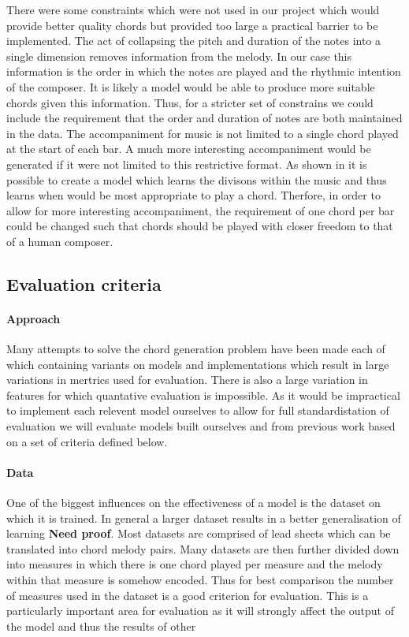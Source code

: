 There were some constraints which were not used in our project which would provide better quality chords but provided too large a practical barrier to be implemented.
The act of collapsing the pitch and duration of the notes into a single dimension removes information from the melody.
In our case this information is the order in which the notes are played and the rhythmic intention of the composer.
It is likely a model would be able to produce more suitable chords given this information.
Thus, for a stricter set of constrains we could include the requirement that the order and duration of notes are both maintained in the data.
The accompaniment for music is not limited to a single chord played at the start of each bar.
A much more interesting accompaniment would be generated if it were not limited to this restrictive format.
As shown in \cite{ReinforcementLearning} it is possible to create a model which learns the divisons within the music and thus learns when would be most appropriate to play a chord.
Therfore, in order to allow for more interesting accompaniment, the requirement of one chord per bar could be changed such that chords should be played with closer freedom to that of a human composer.

\subsection{Evaluation criteria}
\paragraph{Approach}
Many attempts to solve the chord generation problem have been made each of which containing variants on models and implementations which result in large variations in mertrics used for evaluation.
There is also a large variation in features for which quantative evaluation is impossible. 
As it would be impractical to implement each relevent model ourselves to allow for full standardistation of evaluation we will evaluate models built ourselves and from previous work based on a set of criteria defined below.
\paragraph{Data}
One of the biggest influences on the effectiveness of a model is the dataset on which it is trained. 
In general a larger dataset results in a better generalisation of learning \textbf{Need proof}.
Most datasets are comprised of lead sheets which can be translated into chord melody pairs.
Many datasets are then further divided down into measures in which there is one chord played per measure and the melody within that measure is somehow encoded.
Thus for best comparison the number of measures used in the dataset is a good criterion for evaluation.
This is a particularly important area for evaluation as it will strongly affect the output of the model and thus the results of other 

